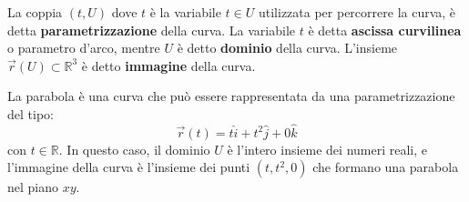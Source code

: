 La coppia $(t, U)$ dove $t$ è la variabile $t\in U$ utilizzata per percorrere la curva, è detta \textbf{parametrizzazione} della curva. 
La variabile $t$ è detta \textbf{ascissa curvilinea} o parametro d'arco, mentre $U$ è detto \textbf{dominio} della curva. L'insieme $\vec r(U) \subset \mathbb{R}^3$ è detto \textbf{immagine} della curva.

\begin{example}[Parabola]
    La parabola è una curva che può essere rappresentata da una parametrizzazione del tipo:
    \begin{equation*}
        \vec r(t) = t\hat i + t^2 \hat j + 0\hat k
    \end{equation*}
    con $t \in \mathbb{R}$. In questo caso, il dominio $U$ è l'intero insieme dei numeri reali, e l'immagine della curva è l'insieme dei punti $(t, t^2, 0)$ che formano una parabola nel piano $xy$.

    \begin{figure}[H]
    \centering
    \end{figure}
    
\end{example}


